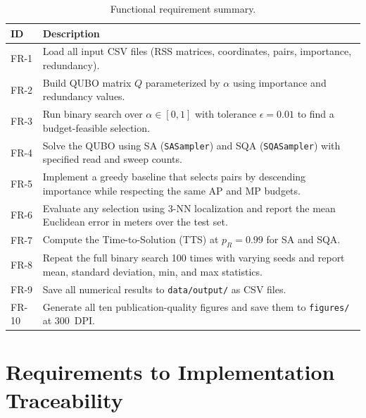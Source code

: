 \documentclass[12pt,a4paper]{article}
\begin{document}
\begin{table}[h!]
\centering
\renewcommand{\arraystretch}{1.3}
\begin{tabular}{@{}lp{10cm}@{}}
\toprule
\textbf{ID} & \textbf{Description} \\
\midrule
FR-1  & Load all input CSV files (RSS matrices, coordinates, pairs,
        importance, redundancy). \\
FR-2  & Build QUBO matrix $Q$ parameterized by $\alpha$ using importance
        and redundancy values. \\
FR-3  & Run binary search over $\alpha \in [0,1]$ with tolerance
        $\epsilon = 0.01$ to find a budget-feasible selection. \\
FR-4  & Solve the QUBO using SA (\texttt{SASampler}) and SQA
        (\texttt{SQASampler}) with specified read and sweep counts. \\
FR-5  & Implement a greedy baseline that selects pairs by descending
        importance while respecting the same AP and MP budgets. \\
FR-6  & Evaluate any selection using 3-NN localization and report the
        mean Euclidean error in meters over the test set. \\
FR-7  & Compute the Time-to-Solution (TTS) at $p_R = 0.99$ for SA and SQA. \\
FR-8  & Repeat the full binary search 100 times with varying seeds and
        report mean, standard deviation, min, and max statistics. \\
FR-9  & Save all numerical results to \texttt{data/output/} as CSV files. \\
FR-10 & Generate all ten publication-quality figures and save them to
        \texttt{figures/} at 300~DPI. \\
\bottomrule
\end{tabular}
\caption{Functional requirement summary.}
\end{table}

\section{Requirements to Implementation Traceability}
\end{document}
